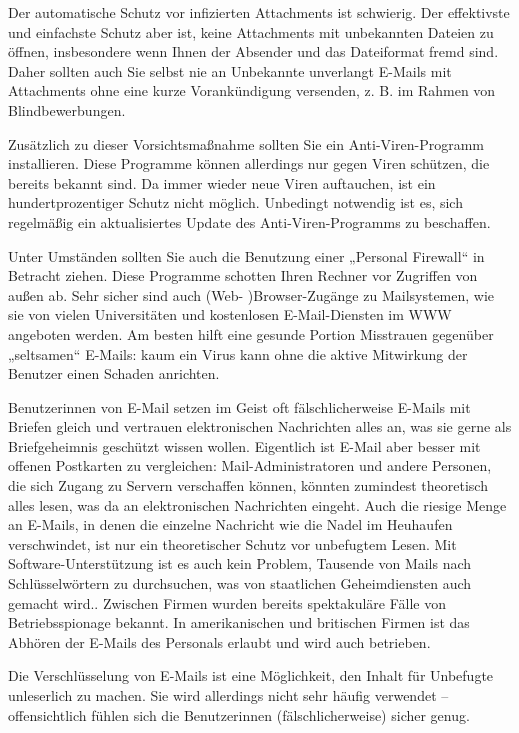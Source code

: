 \documentclass[]{book}
\theoremstyle{definition}
\theoremstyle{definition}
\theoremstyle{definition}
\theoremstyle{remark}
\begin{document}
Der automatische Schutz vor infizierten Attachments ist schwierig. Der
effektivste und einfachste Schutz aber ist, keine Attachments mit
unbekannten Dateien zu öffnen, insbesondere wenn Ihnen der Absender und
das Dateiformat fremd sind. Daher sollten auch Sie selbst nie an
Unbekannte unverlangt E-Mails mit Attachments ohne eine kurze
Vorankündigung versenden, z. B. im Rahmen von Blindbewerbungen.

Zusätzlich zu dieser Vorsichtsmaßnahme sollten Sie ein
Anti-Viren-Programm installieren. Diese Programme können allerdings nur
gegen Viren schützen, die bereits bekannt sind. Da immer wieder neue
Viren auftauchen, ist ein hundertprozentiger Schutz nicht möglich.
Unbedingt notwendig ist es, sich regelmäßig ein aktualisiertes Update
des Anti-Viren-Programms zu beschaffen.

Unter Umständen sollten Sie auch die Benutzung einer „Personal
Firewall`` in Betracht ziehen. Diese Programme schotten Ihren Rechner
vor Zugriffen von außen ab. Sehr sicher sind auch (Web- )Browser-Zugänge
zu Mailsystemen, wie sie von vielen Universitäten und kostenlosen
E-Mail-Diensten im WWW angeboten werden. Am besten hilft eine gesunde
Portion Misstrauen gegenüber „seltsamen`` E-Mails: kaum ein Virus kann
ohne die aktive Mitwirkung der Benutzer einen Schaden anrichten.

Benutzerinnen von E-Mail setzen im Geist oft fälschlicherweise E-Mails
mit Briefen gleich und vertrauen elektronischen Nachrichten alles an,
was sie gerne als Briefgeheimnis geschützt wissen wollen. Eigentlich ist
E-Mail aber besser mit offenen Postkarten zu vergleichen:
Mail-Administratoren und andere Personen, die sich Zugang zu Servern
verschaffen können, könnten zumindest theoretisch alles lesen, was da an
elektronischen Nachrichten eingeht. Auch die riesige Menge an E-Mails,
in denen die einzelne Nachricht wie die Nadel im Heuhaufen verschwindet,
ist nur ein theoretischer Schutz vor unbefugtem Lesen. Mit
Software-Unterstützung ist es auch kein Problem, Tausende von Mails nach
Schlüsselwörtern zu durchsuchen, was von staatlichen Geheimdiensten auch
gemacht wird.. Zwischen Firmen wurden bereits spektakuläre Fälle von
Betriebsspionage bekannt. In amerikanischen und britischen Firmen ist
das Abhören der E-Mails des Personals erlaubt und wird auch betrieben.

Die Verschlüsselung von E-Mails ist eine Möglichkeit, den Inhalt für
Unbefugte unleserlich zu machen. Sie wird allerdings nicht sehr häufig
verwendet -- offensichtlich fühlen sich die Benutzerinnen
(fälschlicherweise) sicher genug.
\end{document}
